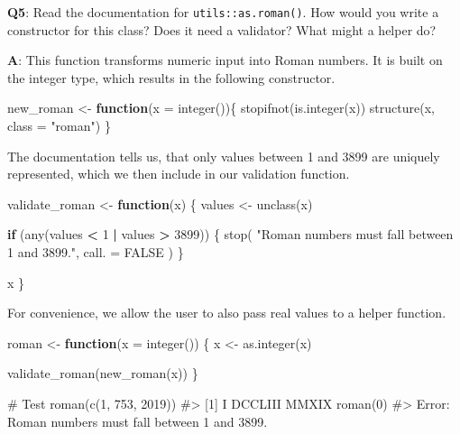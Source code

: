 \documentclass[
]{krantz}
\makeatletter
\newenvironment{Shaded}{\begin{snugshade}}{\end{snugshade}}
\newcommand{\CommentTok}[1]{\textcolor[rgb]{0.56,0.35,0.01}{\textit{#1}}}
\newcommand{\ControlFlowTok}[1]{\textcolor[rgb]{0.13,0.29,0.53}{\textbf{#1}}}
\newcommand{\DataTypeTok}[1]{\textcolor[rgb]{0.13,0.29,0.53}{#1}}
\newcommand{\DecValTok}[1]{\textcolor[rgb]{0.00,0.00,0.81}{#1}}
\newcommand{\KeywordTok}[1]{\textcolor[rgb]{0.13,0.29,0.53}{\textbf{#1}}}
\newcommand{\NormalTok}[1]{#1}
\newcommand{\OperatorTok}[1]{\textcolor[rgb]{0.81,0.36,0.00}{\textbf{#1}}}
\newcommand{\OtherTok}[1]{\textcolor[rgb]{0.56,0.35,0.01}{#1}}
\newcommand{\StringTok}[1]{\textcolor[rgb]{0.31,0.60,0.02}{#1}}
\newenvironment{kframe}{%
\medskip{}
\setlength{\fboxsep}{.8em}
 \def\at@end@of@kframe{}%
 \ifinner\ifhmode%
  \def\at@end@of@kframe{\end{minipage}}%
  \begin{minipage}{\columnwidth}%
 \fi\fi%
 \def\FrameCommand##1{\hskip\@totalleftmargin \hskip-\fboxsep
 \colorbox{shadecolor}{##1}\hskip-\fboxsep
     \hskip-\linewidth \hskip-\@totalleftmargin \hskip\columnwidth}%
 \MakeFramed {\advance\hsize-\width
   \@totalleftmargin\z@ \linewidth\hsize
   \@setminipage}}%
 {\par\unskip\endMakeFramed%
 \at@end@of@kframe}
\renewenvironment{Shaded}{\begin{kframe}}{\end{kframe}}
\renewcommand{\KeywordTok} [1]{\textcolor[rgb]{0.00,0.44,0.13}{{#1}}}
\renewcommand{\DataTypeTok}[1]{\textcolor[rgb]{0.56,0.13,0.00}{{#1}}}
\renewcommand{\DecValTok}  [1]{\textcolor[rgb]{0.25,0.63,0.44}{{#1}}}
\renewcommand{\StringTok}  [1]{\textcolor[rgb]{0.25,0.44,0.63}{{#1}}}
\renewcommand{\CommentTok} [1]{\textcolor[rgb]{0.38,0.63,0.69}{{#1}}}
\renewcommand{\OtherTok}   [1]{\textcolor[rgb]{0.00,0.44,0.13}{{#1}}}
\renewcommand{\NormalTok}  [1]{{#1}}
\makeatother
\begin{document}
\textbf{{Q5}}: Read the documentation for \texttt{utils::as.roman()}. How would you write a constructor for this class? Does it need a validator? What might a helper do?

\textbf{{A}}: This function transforms numeric input into Roman numbers. It is built on the integer type, which results in the following constructor.

\begin{Shaded}
\begin{Highlighting}[]
\NormalTok{new_roman <-}\StringTok{ }\ControlFlowTok{function}\NormalTok{(}\DataTypeTok{x =} \KeywordTok{integer}\NormalTok{())\{}
  \KeywordTok{stopifnot}\NormalTok{(}\KeywordTok{is.integer}\NormalTok{(x))}
  \KeywordTok{structure}\NormalTok{(x, }\DataTypeTok{class =} \StringTok{"roman"}\NormalTok{)}
\NormalTok{\}}
\end{Highlighting}
\end{Shaded}

The documentation tells us, that only values between 1 and 3899 are uniquely represented, which we then include in our validation function.

\begin{Shaded}
\begin{Highlighting}[]
\NormalTok{validate_roman <-}\StringTok{ }\ControlFlowTok{function}\NormalTok{(x) \{}
\NormalTok{  values <-}\StringTok{ }\KeywordTok{unclass}\NormalTok{(x)}
  
  \ControlFlowTok{if}\NormalTok{ (}\KeywordTok{any}\NormalTok{(values }\OperatorTok{<}\StringTok{ }\DecValTok{1} \OperatorTok{|}\StringTok{ }\NormalTok{values }\OperatorTok{>}\StringTok{ }\DecValTok{3899}\NormalTok{)) \{}
    \KeywordTok{stop}\NormalTok{(}
      \StringTok{"Roman numbers must fall between 1 and 3899."}\NormalTok{,}
      \DataTypeTok{call. =} \OtherTok{FALSE}
\NormalTok{    )}
\NormalTok{  \}}
  
\NormalTok{  x}
\NormalTok{\}}
\end{Highlighting}
\end{Shaded}

For convenience, we allow the user to also pass real values to a helper function.

\begin{Shaded}
\begin{Highlighting}[]
\NormalTok{roman <-}\StringTok{ }\ControlFlowTok{function}\NormalTok{(}\DataTypeTok{x =} \KeywordTok{integer}\NormalTok{()) \{}
\NormalTok{  x <-}\StringTok{ }\KeywordTok{as.integer}\NormalTok{(x)}
  
  \KeywordTok{validate_roman}\NormalTok{(}\KeywordTok{new_roman}\NormalTok{(x))}
\NormalTok{\}}

\CommentTok{# Test}
\KeywordTok{roman}\NormalTok{(}\KeywordTok{c}\NormalTok{(}\DecValTok{1}\NormalTok{, }\DecValTok{753}\NormalTok{, }\DecValTok{2019}\NormalTok{))}
\CommentTok{#> [1] I       DCCLIII MMXIX}
\KeywordTok{roman}\NormalTok{(}\DecValTok{0}\NormalTok{)}
\CommentTok{#> Error: Roman numbers must fall between 1 and 3899.}
\end{Highlighting}
\end{Shaded}
\end{document}
